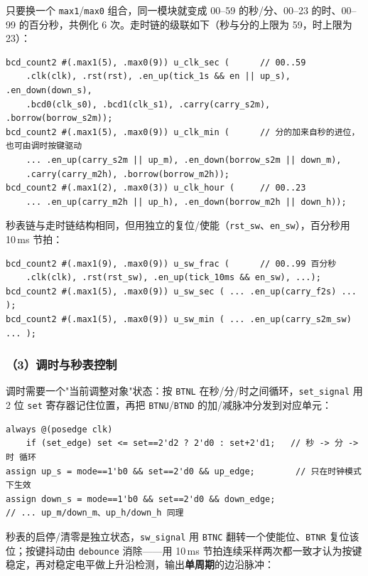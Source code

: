 \documentclass[12pt, a4paper]{ctexart}
\begin{document}
\noindent 只要换一个 \texttt{max1}/\texttt{max0} 组合，同一模块就变成 00--59 的秒/分、00--23 的时、00--99 的百分秒，共例化 6 次。走时链的级联如下（秒与分的上限为 59，时上限为 23）：

\begin{lstlisting}
bcd_count2 #(.max1(5), .max0(9)) u_clk_sec (      // 00..59
    .clk(clk), .rst(rst), .en_up(tick_1s && en || up_s), .en_down(down_s),
    .bcd0(clk_s0), .bcd1(clk_s1), .carry(carry_s2m), .borrow(borrow_s2m));
bcd_count2 #(.max1(5), .max0(9)) u_clk_min (      // 分的加来自秒的进位，也可由调时按键驱动
    ... .en_up(carry_s2m || up_m), .en_down(borrow_s2m || down_m),
    .carry(carry_m2h), .borrow(borrow_m2h));
bcd_count2 #(.max1(2), .max0(3)) u_clk_hour (     // 00..23
    ... .en_up(carry_m2h || up_h), .en_down(borrow_m2h || down_h));
\end{lstlisting}

秒表链与走时链结构相同，但用独立的复位/使能（\texttt{rst\_sw}、\texttt{en\_sw}），百分秒用 10\,ms 节拍：

\begin{lstlisting}
bcd_count2 #(.max1(9), .max0(9)) u_sw_frac (      // 00..99 百分秒
    .clk(clk), .rst(rst_sw), .en_up(tick_10ms && en_sw), ...);
bcd_count2 #(.max1(5), .max0(9)) u_sw_sec ( ... .en_up(carry_f2s) ... );
bcd_count2 #(.max1(5), .max0(9)) u_sw_min ( ... .en_up(carry_s2m_sw) ... );
\end{lstlisting}

\subsubsection*{（3）调时与秒表控制}
调时需要一个"当前调整对象"状态：按 \texttt{BTNL} 在秒/分/时之间循环，\texttt{set\_signal} 用 2 位 \texttt{set} 寄存器记住位置，再把 \texttt{BTNU}/\texttt{BTND} 的加/减脉冲分发到对应单元：

\begin{lstlisting}
always @(posedge clk)
    if (set_edge) set <= set==2'd2 ? 2'd0 : set+2'd1;   // 秒 -> 分 -> 时 循环
assign up_s = mode==1'b0 && set==2'd0 && up_edge;        // 只在时钟模式下生效
assign down_s = mode==1'b0 && set==2'd0 && down_edge;
// ... up_m/down_m、up_h/down_h 同理
\end{lstlisting}

秒表的启停/清零是独立状态，\texttt{sw\_signal} 用 \texttt{BTNC} 翻转一个使能位、\texttt{BTNR} 复位该位；按键抖动由 \texttt{debounce} 消除——用 10\,ms 节拍连续采样两次都一致才认为按键稳定，再对稳定电平做上升沿检测，输出\textbf{单周期}的边沿脉冲：
\end{document}
